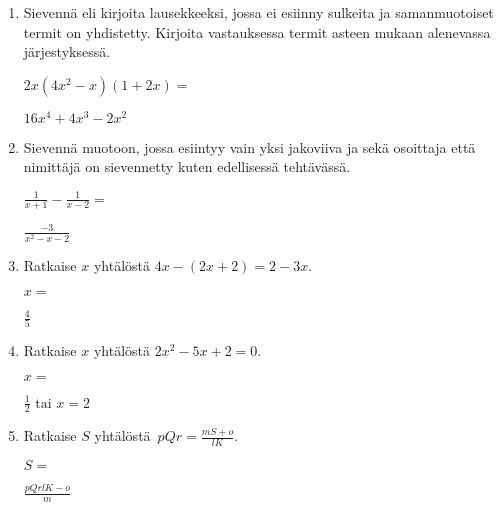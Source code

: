 \documentclass[finnish, a4paper, 12pt]{article}
\begin{document}
\begin{enumerate}[leftmargin=*]
		\vspace{8pt}
		
		\item %
		Sievennä eli kirjoita lausekkeeksi, jossa ei esiinny sulkeita ja 
		samanmuotoiset termit on yhdistetty. 
		Kirjoita vastauksessa termit asteen mukaan alenevassa järjestyksessä. 
		
		\(
		\displaystyle
		2x(4x^2 - x)(1 + 2x) = 
		\) %
		\begin{version:withAnswers}
		\( 16x^4 +4x^3 -2x^2 \)
		\end{version:withAnswers}
		
		\vspace{8pt}
		
		\item %
		Sievennä %
		muotoon, jossa esiintyy vain yksi jakoviiva ja sekä osoittaja
		että nimittäjä on sievennetty kuten edellisessä tehtävässä.
		
		\(
		\displaystyle
		\frac{1}{x+1}- \frac{1}{x - 2} =
		\) %
		\begin{version:withAnswers}
		\( \frac{-3}{x^2-x-2} \)
		\end{version:withAnswers}
		
		\vspace{8pt}
		
		\item %
		Ratkaise \(x\) yhtälöstä \(4x - (2x + 2) = 2 - 3x\).
		
		\(
		x = 
		\)	%
		\begin{version:withAnswers}
		 \( \frac{4}{5} \)
		\end{version:withAnswers}
		\vspace{8pt}
		
		\item %
		Ratkaise \(x\) yhtälöstä \(2x^2-5x+2= 0\).
		
		\(
		x = 		
		\)	%
		
		\begin{version:withAnswers}
		\(\frac{1}{2} \text{  tai } x = 2\)
		\end{version:withAnswers}
		\vspace{8pt}
		
		\item %
		Ratkaise \(S\) yhtälöstä 
		\(
		\displaystyle \,
		pQr = \frac{mS+o}{lK} .
		\)	
		
		\(
		S = 
		\) %
		\begin{version:withAnswers}
		\( \frac{pQrlK -o}{m}\)
		\end{version:withAnswers}
		
	\end{enumerate}
	
	
\end{document}

